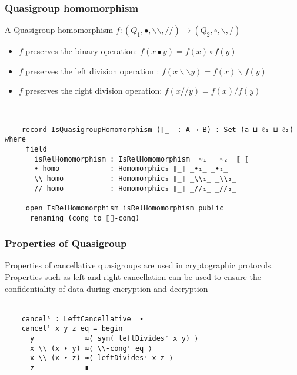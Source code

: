 \documentclass[xcolor={dvipsnames}]{beamer}
\begin{document}
\begin{frame}[fragile]
  \frametitle{Quasigroup homomorphism}
    A Quasigroup homomorphism \( f:(Q_1,∙,\backslash \backslash,//) \rightarrow
    (Q_2,\circ,\backslash,/) \)
    \begin{itemize}
        \item $f$ preserves the binary operation: $f(x∙y) = f(x) \circ f(y)$
        \item $f$ preserves the left division operation : $f(x\backslash \backslash y) = f(x)\backslash f(y)$
        \item $f$ preserves the right division operation: $f(x//y) = f(x)/f(y)$
    \end{itemize}
\\
\begin{verbatim}
    record IsQuasigroupHomomorphism (⟦_⟧ : A → B) : Set (a ⊔ ℓ₁ ⊔ ℓ₂) where
     field
       isRelHomomorphism : IsRelHomomorphism _≈₁_ _≈₂_ ⟦_⟧
       ∙-homo            : Homomorphic₂ ⟦_⟧ _∙₁_ _∙₂_
       \\-homo           : Homomorphic₂ ⟦_⟧ _\\₁_ _\\₂_
       //-homo           : Homomorphic₂ ⟦_⟧ _//₁_ _//₂_
  
     open IsRelHomomorphism isRelHomomorphism public
      renaming (cong to ⟦⟧-cong)
\end{verbatim}
\end{frame}
  
  \begin{frame}[fragile]
    \frametitle{Properties of Quasigroup}  

      Properties of cancellative quasigroups are used in cryptographic
      protocols. Properties such as left and right cancellation can be
      used to ensure the confidentiality of data during encryption and
      decryption
      \\ \\
\begin{center}
  \centering
  \begin{verbatim}
    cancelˡ : LeftCancellative _∙_
    cancelˡ x y z eq = begin
      y            ≈⟨ sym( leftDividesʳ x y) ⟩
      x \\ (x ∙ y) ≈⟨ \\-congˡ eq ⟩
      x \\ (x ∙ z) ≈⟨ leftDividesʳ x z ⟩
      z            ∎
  \end{verbatim}
\end{center}

  \end{frame}
\end{document}
